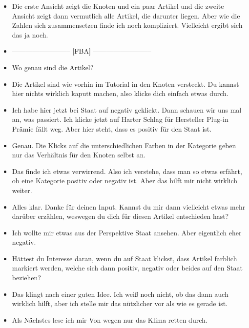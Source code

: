 {\begin{itemize}[]
        \item {} Die erste Ansicht zeigt die Knoten und ein paar Artikel und die zweite Ansicht zeigt dann vermutlich alle Artikel, die darunter liegen.
              Aber wie die Zahlen sich zusammensetzen finde ich noch kompliziert.
              Vielleicht ergibt sich das ja noch.
        \item {--------------------------} [FBA] {--------------------------}
        \item {} Wo genau sind die Artikel?
        \item {} Die Artikel sind wie vorhin im Tutorial in den Knoten versteckt.
              Du kannst hier nichts wirklich kaputt machen, also klicke dich einfach etwas durch.
        \item {} Ich habe hier jetzt bei Staat auf negativ geklickt.
              Dann schauen wir uns mal an, was passiert.
              Ich klicke jetzt auf \flqq Harter Schlag für Hersteller Plug-in Prämie fällt weg\frqq{}.
              Aber hier steht, dass es positiv für den Staat ist.
        \item {} Genau.
              Die Klicks auf die unterschiedlichen Farben in der Kategorie geben nur das Verhältnis für den Knoten selbst an.
        \item {} Das finde ich etwas verwirrend.
              Also ich verstehe, dass man so etwas erfährt, ob eine Kategorie positiv oder negativ ist.
              Aber das hilft mir nicht wirklich weiter.
        \item {} Alles klar.
              Danke für deinen Input.
              Kannst du mir dann vielleicht etwas mehr darüber erzählen, weswegen du dich für diesen Artikel entschieden hast?
        \item {} Ich wollte mir etwas aus der Perspektive Staat ansehen. Aber eigentlich eher negativ.
        \item {} Hättest du Interesse daran, wenn du auf Staat klickst, dass Artikel farblich markiert werden, welche sich dann positiv, negativ oder beides auf den Staat beziehen?
        \item {} Das klingt nach einer guten Idee.
              Ich weiß noch nicht, ob das dann auch wirklich hilft, aber ich stelle mir das nützlicher vor als wie es gerade ist.
        \item {} Als Nächstes lese ich mir \flqq Von wegen nur das Klima retten\frqq{} durch.

\end{itemize}}
